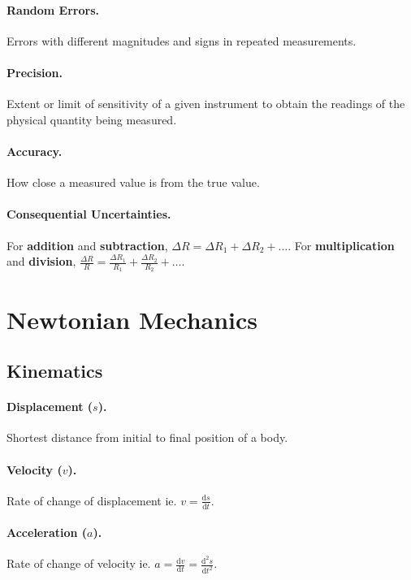 \documentclass{article}
\begin{document}
\paragraph{Random Errors.} Errors with different magnitudes and signs in
repeated measurements.

\paragraph{Precision.} Extent or limit of sensitivity of a given instrument to
obtain the readings of the physical quantity being measured.

\paragraph{Accuracy.} How close a measured value is from the true value.

\paragraph{Consequential Uncertainties.} For \textbf{addition} and
\textbf{subtraction}, $\Delta R = \Delta R_1 + \Delta R_2 + \ldots$. For
\textbf{multiplication} and \textbf{division}, $\frac{\Delta R}{R} =
\frac{\Delta R_1}{R_1} + \frac{\Delta R_2}{R_2} + \ldots$.

\section{Newtonian Mechanics}

\subsection{Kinematics}

\paragraph{Displacement ($s$).} Shortest distance from initial to final position
of a body.

\paragraph{Velocity ($v$).} Rate of change of displacement ie. $v =
\frac{\mathrm{d}s}{\mathrm{d}t}$.

\paragraph{Acceleration ($a$).} Rate of change of velocity ie. $a =
\frac{\mathrm{d}v}{\mathrm{d}t} = \frac{\mathrm{d}^2s}{\mathrm{d}t^2}$.
\end{document}
